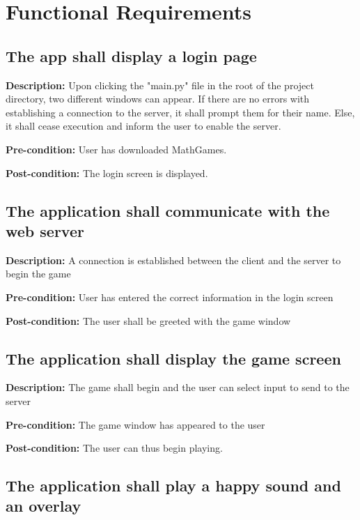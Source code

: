 \documentclass[12pt]{article}
\begin{document}
\newpage

\section{Functional Requirements}

\begin{flushleft}

\subsection{The app shall display a login page}

\textbf{Description:} Upon clicking the "main.py" file in the root of the project directory, two different windows can appear. If there are no errors with establishing a connection to the server, it shall prompt them for their name. Else, it shall cease execution and inform the user to enable the server.

\textbf{Pre-condition:} User has downloaded MathGames.

\textbf{Post-condition:} The login screen is displayed.


\subsection{The application shall communicate with the web server}

\textbf{Description:} A connection is established between the client and the server to begin the game

\textbf{Pre-condition:} User has entered the correct information in the login screen

\textbf{Post-condition:} The user shall be greeted with the game window

\subsection{The application shall display the game screen}

\textbf{Description:} The game shall begin and the user can select input to send to the server

\textbf{Pre-condition:} The game window has appeared to the user

\textbf{Post-condition:} The user can thus begin playing.

\subsection{The application shall play a happy sound and an overlay}


\end{flushleft}
\end{document}
